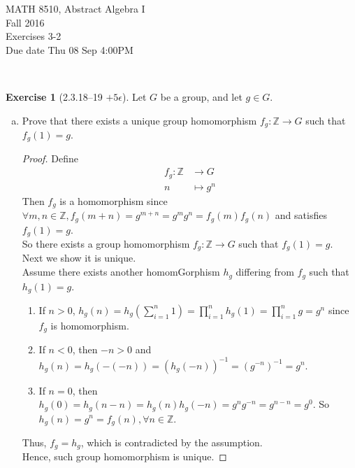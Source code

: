 \documentclass{amsart}
\newcommand{\bbz}{\mathbb{Z}}
\theoremstyle{plain}
\theoremstyle{definition}
\newtheorem{exer}[lem]{Exercise}
\begin{document}
\noindent MATH 8510, Abstract Algebra I \\
Fall 2016\\
Exercises 3-2\\
Due date Thu 08 Sep 4:00PM

\

%
%

\begin{exer}[2.3.18--19 $+5\epsilon$]
Let $G$ be a group, and let $g\in G$.
\begin{enumerate}[(a)]
\item Prove that there exists a unique group homomorphism $f_g\colon\bbz\to G$ such that $f_g(1)=g$. 
	\begin{proof}
		Define
		\begin{align*}
			f_g:\bbz & \to G \\
			n & \mapsto g^n
		\end{align*}
		Then $f_g$ is a homomorphism since $\forall m,n \in \bbz, f_g(m+n) = g^{m+n} = g^mg^n = f_g(m)f_g(n)$ and satisfies $f_g(1) = g$.\\
		So there exists a group homomorphism $f_g\colon\bbz\to G$ such that $f_g(1)=g$.\\
		Next we show it is unique.\\
		Assume there exists another homomGorphism $h_g$ differing from $f_g$ such that $h_g(1) = g$. 
		\begin{enumerate}
			\item If $n > 0$, $h_g(n) = h_g(\sum_{i=1}^n1) = \prod_{i=1}^nh_g(1) = \prod_{i=1}^n g = g^n$ since $f_g$ is homomorphism.
			\item If $n < 0$, then $-n > 0$ and $h_g(n) = h_g(-(-n)) = (h_g(-n))^{-1} = (g^{-n})^{-1} = g^n$.
			\item If $n = 0$, then $h_g(0) = h_g(n-n) = h_g(n)h_g(-n) = g^ng^{-n} = g^{n-n} = g^0$.
				So $h_g(n) = g^n = f_g(n), \forall n \in \bbz$. \\
		\end{enumerate}
		Thus, $f_g = h_g$, which is contradicted by the assumption.\\
		Hence, such group homomorphism is unique.
	\end{proof}
	

\end{enumerate}
\end{exer}
\end{document}
